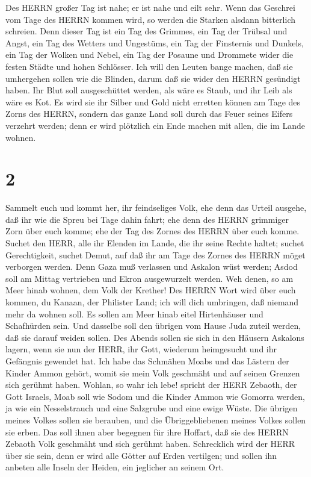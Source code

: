  Des HERRN großer Tag ist nahe; er ist nahe und eilt sehr.
Wenn das Geschrei vom Tage des HERRN kommen wird, so werden die Starken
alsdann bitterlich schreien.  Denn dieser Tag ist ein Tag
des Grimmes, ein Tag der Trübsal und Angst, ein Tag des Wetters und
Ungestüms, ein Tag der Finsternis und Dunkels, ein Tag der Wolken und
Nebel,  ein Tag der Posaune und Drommete wider die festen
Städte und hohen Schlösser.  Ich will den Leuten bange
machen, daß sie umhergehen sollen wie die Blinden, darum daß sie wider
den HERRN gesündigt haben. Ihr Blut soll ausgeschüttet werden, als wäre
es Staub, und ihr Leib als wäre es Kot.  Es wird sie ihr
Silber und Gold nicht erretten können am Tage des Zorns des HERRN,
sondern das ganze Land soll durch das Feuer seines Eifers verzehrt
werden; denn er wird plötzlich ein Ende machen mit allen, die im Lande
wohnen.

\hypertarget{section-1}{%
\section{2}\label{section-1}}

 Sammelt euch und kommt her, ihr feindseliges Volk,
 ehe denn das Urteil ausgehe, daß ihr wie die Spreu bei Tage
dahin fahrt; ehe denn des HERRN grimmiger Zorn über euch komme; ehe der
Tag des Zornes des HERRN über euch komme.  Suchet den HERR,
alle ihr Elenden im Lande, die ihr seine Rechte haltet; suchet
Gerechtigkeit, suchet Demut, auf daß ihr am Tage des Zornes des HERRN
möget verborgen werden.  Denn Gaza muß verlassen und Askalon
wüst werden; Asdod soll am Mittag vertrieben und Ekron ausgewurzelt
werden.  Weh denen, so am Meer hinab wohnen, dem Volk der
Krether! Des HERRN Wort wird über euch kommen, du Kanaan, der Philister
Land; ich will dich umbringen, daß niemand mehr da wohnen soll.
 Es sollen am Meer hinab eitel Hirtenhäuser und Schafhürden
sein.  Und dasselbe soll den übrigen vom Hause Juda zuteil
werden, daß sie darauf weiden sollen. Des Abends sollen sie sich in den
Häusern Askalons lagern, wenn sie nun der HERR, ihr Gott, wiederum
heimgesucht und ihr Gefängnis gewendet hat.  Ich habe das
Schmähen Moabs und das Lästern der Kinder Ammon gehört, womit sie mein
Volk geschmäht und auf seinen Grenzen sich gerühmt haben. 
Wohlan, so wahr ich lebe! spricht der HERR Zebaoth, der Gott Israels,
Moab soll wie Sodom und die Kinder Ammon wie Gomorra werden, ja wie ein
Nesselstrauch und eine Salzgrube und eine ewige Wüste. Die übrigen
meines Volkes sollen sie berauben, und die Übriggebliebenen meines
Volkes sollen sie erben.  Das soll ihnen aber begegnen für
ihre Hoffart, daß sie des HERRN Zebaoth Volk geschmäht und sich gerühmt
haben.  Schrecklich wird der HERR über sie sein, denn er
wird alle Götter auf Erden vertilgen; und sollen ihn anbeten alle Inseln
der Heiden, ein jeglicher an seinem Ort.

